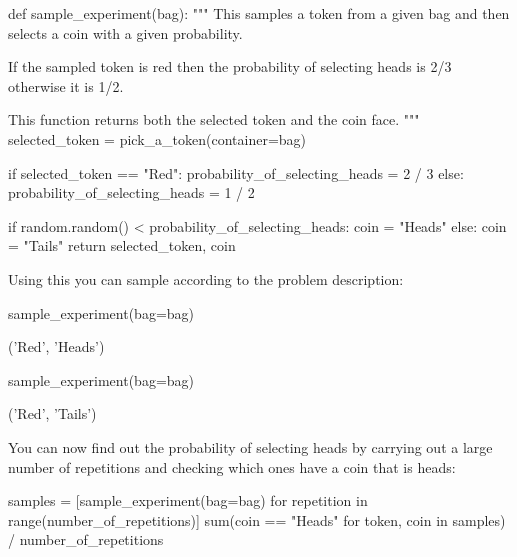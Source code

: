 \begin{pyin}
def sample_experiment(bag):
    """
    This samples a token from a given bag and then
    selects a coin with a given probability.

    If the sampled token is red then the probability
    of selecting heads is 2/3 otherwise it is 1/2.

    This function returns both the selected token
    and the coin face.
    """
    selected_token = pick_a_token(container=bag)

    if selected_token == "Red":
        probability_of_selecting_heads = 2 / 3
    else:
        probability_of_selecting_heads = 1 / 2

    if random.random() < probability_of_selecting_heads:
        coin = "Heads"
    else:
        coin = "Tails"
    return selected_token, coin
\end{pyin}





Using this you can sample according to the problem description:





\begin{pyin}
sample_experiment(bag=bag)
\end{pyin}





\begin{raw}
('Red', 'Heads')
\end{raw}


\begin{pyin}
sample_experiment(bag=bag)
\end{pyin}

\begin{raw}
('Red', 'Tails')
\end{raw}






You can now find out the probability of selecting heads by carrying out a large
number of repetitions and checking which ones have a coin that is heads:





\begin{pyin}
samples = [sample_experiment(bag=bag) for repetition in range(number_of_repetitions)]
sum(coin == "Heads" for token, coin in samples) / number_of_repetitions
\end{pyin}





